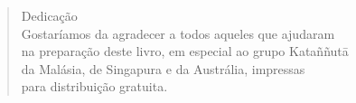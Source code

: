 \cleartorecto
\thispagestyle{empty}


\mbox{}\vfill

\begin{verse}

{\upshape Dedicação}\\[0.4\baselineskip]
Gostaríamos da agradecer a todos aqueles que ajudaram\\
na preparação deste livro, em especial ao grupo Kataññutā\\
da Malásia, de Singapura e da Austrália, impressas\\
para distribuição gratuita.

\end{verse}

\vfill\mbox{}
